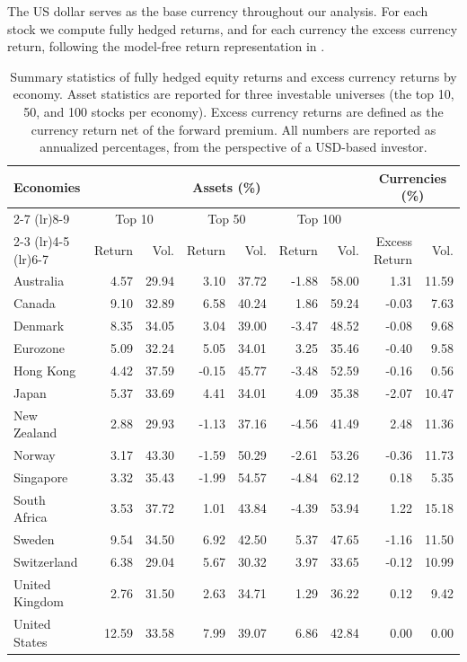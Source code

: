 The US dollar serves as the base currency throughout our analysis. For each stock we compute fully hedged
returns, and for each currency the excess currency return, following the model-free return
representation in .

\begin{table}[htbp]
  \centering
  \small
  \begin{tabular}{@{}lrrrrrrrr@{}}
    \toprule
    \multirow{3}{*}{Economies} & \multicolumn{6}{c}{Assets (\%)} & \multicolumn{2}{c}{Currencies (\%)} \\
    \cmidrule(lr){2-7} \cmidrule(lr){8-9}
     & \multicolumn{2}{c}{Top 10} & \multicolumn{2}{c}{Top 50} & \multicolumn{2}{c}{Top 100} & & \\
    \cmidrule(lr){2-3} \cmidrule(lr){4-5} \cmidrule(lr){6-7}
     & Return & Vol. & Return & Vol. & Return & Vol. & Excess Return & Vol. \\
    \midrule
    Australia      &  4.57 & 29.94 &  3.10 & 37.72 & -1.88 & 58.00 &  1.31 & 11.59 \\
    Canada         &  9.10 & 32.89 &  6.58 & 40.24 &  1.86 & 59.24 & -0.03 &  7.63 \\
    Denmark        &  8.35 & 34.05 &  3.04 & 39.00 & -3.47 & 48.52 & -0.08 &  9.68 \\
    Eurozone       &  5.09 & 32.24 &  5.05 & 34.01 &  3.25 & 35.46 & -0.40 &  9.58 \\
    Hong Kong      &  4.42 & 37.59 & -0.15 & 45.77 & -3.48 & 52.59 & -0.16 &  0.56 \\
    Japan          &  5.37 & 33.69 &  4.41 & 34.01 &  4.09 & 35.38 & -2.07 & 10.47 \\
    New Zealand    &  2.88 & 29.93 & -1.13 & 37.16 & -4.56 & 41.49 &  2.48 & 11.36 \\
    Norway         &  3.17 & 43.30 & -1.59 & 50.29 & -2.61 & 53.26 & -0.36 & 11.73 \\
    Singapore      &  3.32 & 35.43 & -1.99 & 54.57 & -4.84 & 62.12 &  0.18 &  5.35 \\
    South Africa   &  3.53 & 37.72 &  1.01 & 43.84 & -4.39 & 53.94 &  1.22 & 15.18 \\
    Sweden         &  9.54 & 34.50 &  6.92 & 42.50 &  5.37 & 47.65 & -1.16 & 11.50 \\
    Switzerland    &  6.38 & 29.04 &  5.67 & 30.32 &  3.97 & 33.65 & -0.12 & 10.99 \\
    United Kingdom &  2.76 & 31.50 &  2.63 & 34.71 &  1.29 & 36.22 &  0.12 &  9.42 \\
    United States  & 12.59 & 33.58 &  7.99 & 39.07 &  6.86 & 42.84 &  0.00 &  0.00 \\
    \bottomrule
  \end{tabular}
  \caption{Summary statistics of fully hedged equity returns and excess currency
  returns by economy. Asset statistics are reported for three investable universes
  (the top 10, 50, and 100 stocks per economy). Excess currency returns
  are defined as the currency return net of the forward premium. 
  All numbers are reported as annualized percentages, from the perspective of a USD-based investor.}
  \label{tab:summary-statistics}
\end{table}


